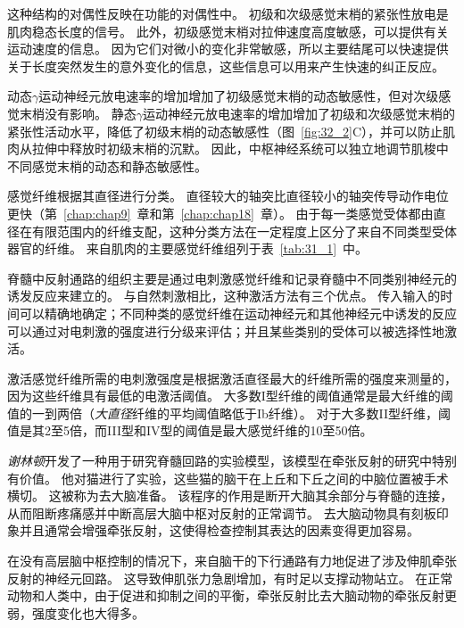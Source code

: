 \begin{proposition}[肌梭]
	\quad \quad 这种结构的对偶性反映在功能的对偶性中。
	初级和次级感觉末梢的紧张性放电是肌肉稳态长度的信号。
	此外，初级感觉末梢对拉伸速度高度敏感，可以提供有关运动速度的信息。
	因为它们对微小的变化非常敏感，所以主要结尾可以快速提供关于长度突然发生的意外变化的信息，这些信息可以用来产生快速的纠正反应。
	
	\quad \quad 动态$ \gamma $运动神经元放电速率的增加增加了初级感觉末梢的动态敏感性，但对次级感觉末梢没有影响。
	静态$ \gamma $运动神经元放电速率的增加增加了初级和次级感觉末梢的紧张性活动水平，降低了初级末梢的动态敏感性（图~\ref{fig:32_2}C），并可以防止肌肉从拉伸中释放时初级末梢的沉默。
	因此，中枢神经系统可以独立地调节肌梭中不同感觉末梢的动态和静态敏感性。
	
\end{proposition}


\begin{proposition}[肌肉感觉纤维的分类] \label{box:32_2}
	
	\quad \quad 感觉纤维根据其直径进行分类。
	直径较大的轴突比直径较小的轴突传导动作电位更快（第~\ref{chap:chap9}~章和第~\ref{chap:chap18}~章）。
	由于每一类感觉受体都由直径在有限范围内的纤维支配，这种分类方法在一定程度上区分了来自不同类型受体器官的纤维。
	来自肌肉的主要感觉纤维组列于表~\ref{tab:31_1}~中。
	
	\quad \quad 脊髓中反射通路的组织主要是通过电刺激感觉纤维和记录脊髓中不同类别神经元的诱发反应来建立的。
	与自然刺激相比，这种激活方法有三个优点。
	传入输入的时间可以精确地确定；不同种类的感觉纤维在运动神经元和其他神经元中诱发的反应可以通过对电刺激的强度进行分级来评估；并且某些类别的受体可以被选择性地激活。
	
	\quad \quad 激活感觉纤维所需的电刺激强度是根据激活直径最大的纤维所需的强度来测量的，因为这些纤维具有最低的电激活阈值。
	大多数I型纤维的阈值通常是最大纤维的阈值的一到两倍（\textit{大直径}纤维的平均阈值略低于Ib纤维）。
	对于大多数II型纤维，阈值是其2至5倍，而III型和IV型的阈值是最大感觉纤维的10至50倍。
	
\end{proposition}


\textit{谢林顿}开发了一种用于研究脊髓回路的实验模型，该模型在牵张反射的研究中特别有价值。
他对猫进行了实验，这些猫的脑干在上丘和下丘之间的中脑位置被手术横切。
这被称为去大脑准备。
该程序的作用是断开大脑其余部分与脊髓的连接，从而阻断疼痛感并中断高层大脑中枢对反射的正常调节。
去大脑动物具有刻板印象并且通常会增强牵张反射，这使得检查控制其表达的因素变得更加容易。


在没有高层脑中枢控制的情况下，来自脑干的下行通路有力地促进了涉及伸肌牵张反射的神经元回路。
这导致伸肌张力急剧增加，有时足以支撑动物站立。
在正常动物和人类中，由于促进和抑制之间的平衡，牵张反射比去大脑动物的牵张反射更弱，强度变化也大得多。



